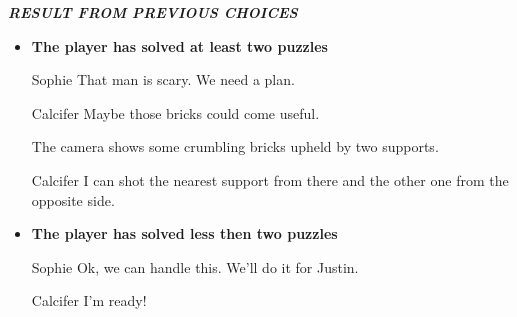 \textit{\textbf{RESULT FROM PREVIOUS CHOICES}}
\begin{itemize}
  \item \textbf{The player has solved at least two puzzles}
  
\begin{screenplay}

\begin{dialogue}{Sophie}
  That man is scary. We need a plan.
\end{dialogue}

\begin{dialogue}{Calcifer}
  Maybe those bricks could come useful.
\end{dialogue}

The camera shows some crumbling bricks upheld by two supports.

\begin{dialogue}{Calcifer}
  I can shot the nearest support from there and the other one from the opposite side.
\end{dialogue}

\end{screenplay}
\vspace{1em}
  
  \item \textbf{The player has solved less then two puzzles}
  
\begin{screenplay}

\begin{dialogue}[determined]{Sophie}
  Ok, we can handle this. We'll do it for Justin.
\end{dialogue}
  
\begin{dialogue}[determined]{Calcifer}
  I'm ready!
\end{dialogue}

\end{screenplay}
\vspace{1em}
  
\end{itemize}

